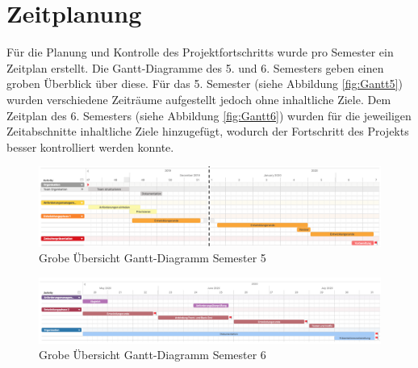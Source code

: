 \section{Zeitplanung}
Für die Planung und Kontrolle des Projektfortschritts wurde pro Semester ein Zeitplan erstellt.
Die Gantt-Diagramme des 5. und 6. Semesters geben einen groben Überblick über diese.
Für das 5. Semester (siehe Abbildung \vref{fig:Gantt5}) wurden verschiedene Zeiträume aufgestellt jedoch ohne inhaltliche Ziele.
Dem Zeitplan des 6. Semesters (siehe Abbildung \vref{fig:Gantt6}) wurden für die jeweiligen Zeitabschnitte inhaltliche Ziele hinzugefügt, wodurch der Fortschritt des Projekts besser kontrolliert werden konnte.

\begin{figure}[H]
	\centering 
	\includegraphics[width=\textwidth]{img/GanttSemester5.png}
	\captionsetup{format=hang}
	\caption[Grobe Übersicht Gantt-Diagramm Semester 5]{\label{fig:Gantt5}Grobe Übersicht Gantt-Diagramm Semester 5}
\end{figure}

\begin{figure}[H]
	\centering 
	\includegraphics[width=\textwidth]{img/GanttSemester6.png}
	\captionsetup{format=hang}
	\caption[Grobe Übersicht Gantt-Diagramm Semester 6]{\label{fig:Gantt6}Grobe Übersicht Gantt-Diagramm Semester 6}
\end{figure}